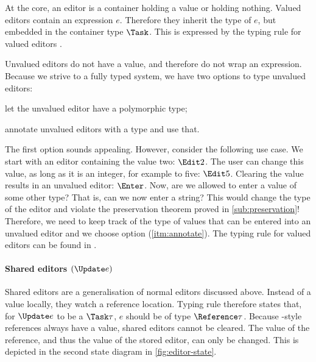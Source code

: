 At the core,
an editor is a container holding a value
or holding nothing.
Valued editors contain an expression $e$.
Therefore they inherit the type of $e$,
but embedded in the container type $\Task$.
This is expressed by the typing rule for valued editors .

Unvalued editors do not have a value,
and therefore do not wrap an expression.
Because we strive to a fully typed system,
we have two options to type unvalued editors:
\begin{enumerate*}
  \item let the unvalued editor have a polymorphic type;
  \item annotate unvalued editors with a type and use that. \label{itm:annotate}
\end{enumerate*}

The first option sounds appealing.
However, consider the following use case.
We start with an editor containing the value two: $\Edit 2$.
The user can change this value, as long as it is an integer,
for example to five: $\Edit 5$.
Clearing the value results in an unvalued editor: $\Enter$.
Now, are we allowed to enter a value of some other type?
That is, can we now enter a string?
This would change the type of the editor
and violate the preservation theorem proved in \autoref{sub:preservation}!
Therefore,
we need to keep track of the type of values that can be entered into an unvalued editor
and we choose option (\ref{itm:annotate}).
The typing rule for valued editors can be found in .



\paragraph{Shared editors $(\Update e)$}

Shared editors are a generalisation of normal editors discussed above.
Instead of  a value locally,
they watch a reference location.
Typing rule  therefore states that,
for $\Update e$ to be a $\Task \tau$,
$e$ should be of type $\Reference \tau$.
Because \ML-style references always have a value,
shared editors cannot be cleared.
The value of the reference,
and thus the value of the stored editor,
can only be changed.
This is depicted in the second state diagram in \autoref{fig:editor-state}.

